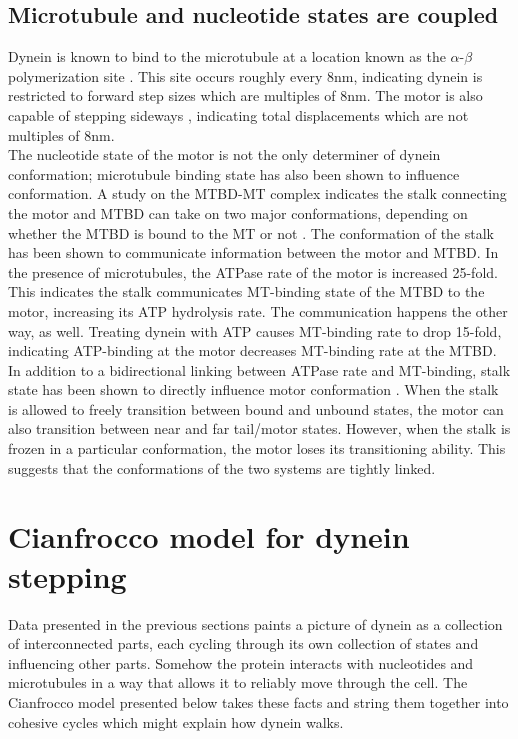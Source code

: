\documentclass[
11pt, %
english, %
singlespacing, %
headsepline, %
chapterinoneline, %
]{MastersDoctoralThesis} %
\begin{document}
\subsection{Microtubule and nucleotide states are coupled}
Dynein is known to bind to the microtubule at a location known as the $\alpha$-$\beta$ polymerization site \cite{redwineMTBDcomplex}. This site occurs roughly every 8nm, indicating dynein is restricted to forward step sizes which are multiples of 8nm. The motor is also capable of stepping sideways \cite{weihongpaper}, indicating total displacements which are not multiples of 8nm.\\

The nucleotide state of the motor is not the only determiner of dynein conformation; microtubule binding state has also been shown to influence conformation. A study on the MTBD-MT complex indicates the stalk connecting the motor and MTBD can take on two major conformations, depending on whether the MTBD is bound to the MT or not \cite{mt-atp-coupling}. The conformation of the stalk has been shown to communicate information between the motor and MTBD. In the presence of microtubules, the ATPase rate of the motor is increased 25-fold. This indicates the stalk communicates MT-binding state of the MTBD to the motor, increasing its ATP hydrolysis rate. The communication happens the other way, as well. Treating dynein with ATP causes MT-binding rate to drop 15-fold, indicating ATP-binding at the motor decreases MT-binding rate at the MTBD.\\

In addition to a bidirectional linking between ATPase rate and MT-binding, stalk state has been shown to directly influence motor conformation \cite{mt-atp-coupling}. When the stalk is allowed to freely transition between bound and unbound states, the motor can also transition between near and far tail/motor states. However, when the stalk is frozen in a particular conformation, the motor loses its transitioning ability. This suggests that the conformations of the two systems are tightly linked.\\

\section{Cianfrocco model for dynein stepping}
\label{sec:cianfrocco-model}
Data presented in the previous sections paints a picture of dynein as a collection of interconnected parts, each cycling through its own collection of states and influencing other parts. Somehow the protein interacts with nucleotides and microtubules in a way that allows it to reliably move through the cell. The Cianfrocco model presented below takes these facts and string them together into cohesive cycles which might explain how dynein walks.\\
\end{document}

